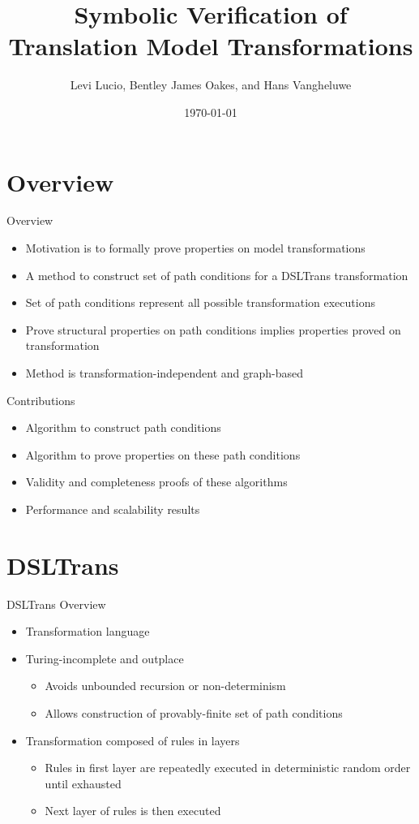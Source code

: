 \documentclass[xcolor=dvipsnames, 14pt]{beamer}
\author[Lucio, Oakes, Vangheluwe]{Levi Lucio, Bentley James Oakes, and Hans Vangheluwe}
\title[Sym. Veri. of Translation Model Trans.]{Symbolic Verification of
Translation Model Transformations}
\date{\today}
\begin{document}
\begin{frame}
\titlepage
\end{frame}

\begin{frame}
\tableofcontents
\end{frame}

\section{Overview}
\begin{frame}{Overview}
\begin{itemize}
\item Motivation is to formally prove properties on model transformations
\item A method to construct set of path conditions for a DSLTrans transformation
\item Set of path conditions represent all possible transformation executions
\item Prove structural properties on path conditions implies properties proved on transformation
\item Method is transformation-independent and graph-based
\end{itemize}
\end{frame}

\begin{frame}{Contributions}
\begin{itemize}
\item Algorithm to construct path conditions
\item Algorithm to prove properties on these path conditions
\item Validity and completeness proofs of these algorithms
\item Performance and scalability results
\end{itemize}
\end{frame}

\section{DSLTrans}
\begin{frame}{DSLTrans Overview}
\begin{itemize}


\item Transformation language
\item Turing-incomplete and outplace
\begin{itemize}
\item Avoids unbounded recursion or non-determinism
\item Allows construction of provably-finite set of path conditions
\end{itemize}
\item Transformation composed of rules in layers
\begin{itemize}
\item Rules in first layer are repeatedly executed in deterministic random order until exhausted
\item Next layer of rules is then executed
\end{itemize}
\end{itemize}
\end{frame}
\end{document}
